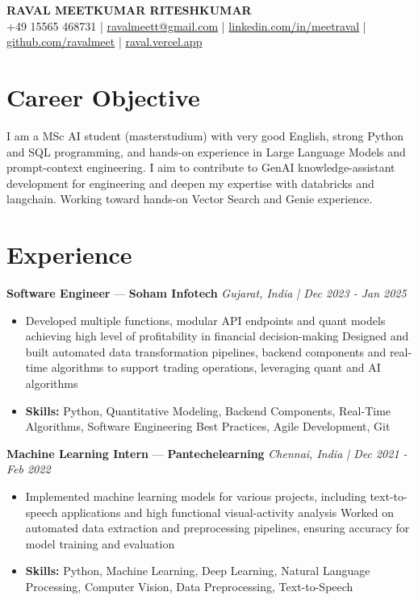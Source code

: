 \documentclass[a4paper,10pt]{article}
\begin{document}
\begin{center}
  {\Large\bfseries RAVAL MEETKUMAR RITESHKUMAR}\\[2pt]
  {\small +49 15565 468731 \;|\; \href{mailto:ravalmeett@gmail.com}{ravalmeett@gmail.com} \;|\; \href{https://www.linkedin.com/in/meetraval/}{linkedin.com/in/meetraval} \;|\; \href{https://github.com/ravalmeet}{github.com/ravalmeet} \;|\; \href{https://raval.vercel.app/}{raval.vercel.app}}
\end{center}
\vspace{-3pt}

\section*{Career Objective}
I am a MSc AI student (masterstudium) with very good English, strong Python and SQL programming, and hands-on experience in Large Language Models and prompt-context engineering. I aim to contribute to GenAI knowledge-assistant development for engineering and deepen my expertise with databricks and langchain. Working toward hands-on Vector Search and Genie experience.\par

\section*{Experience}
\textbf{Software Engineer} — \textbf{Soham Infotech} \hfill \textit{Gujarat, India \;|\; Dec 2023 - Jan 2025}\par
\vspace{1pt}
\begin{itemize}
  \item Developed multiple functions, modular API endpoints and quant models achieving high level of profitability in financial decision-making Designed and built automated data transformation pipelines, backend components and real-time algorithms to support trading operations, leveraging quant and AI algorithms
  \item \textbf{Skills:} Python, Quantitative Modeling, Backend Components, Real-Time Algorithms, Software Engineering Best Practices, Agile Development, Git
\end{itemize}
\vspace{3pt}
\textbf{Machine Learning Intern} — \textbf{Pantechelearning} \hfill \textit{Chennai, India \;|\; Dec 2021 - Feb 2022}\par
\vspace{1pt}
\begin{itemize}
  \item Implemented machine learning models for various projects, including text-to-speech applications and high functional visual-activity analysis Worked on automated data extraction and preprocessing pipelines, ensuring accuracy for model training and evaluation
  \item \textbf{Skills:} Python, Machine Learning, Deep Learning, Natural Language Processing, Computer Vision, Data Preprocessing, Text-to-Speech
\end{itemize}
\end{document}
